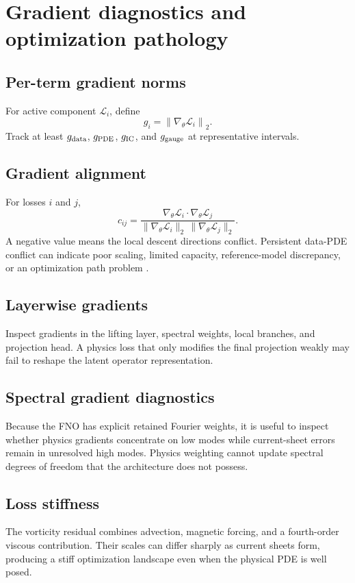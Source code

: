 \documentclass[11pt]{article}
\begin{document}
\section{Gradient diagnostics and optimization pathology}
\label{sec:gradients}

\subsection{Per-term gradient norms}
For active component $\mathcal{L}_i$, define
\begin{equation}
g_i=\left\|\nabla_\theta\mathcal{L}_i\right\|_2.
\end{equation}
Track at least $g_{\rm data}$, $g_{\rm PDE}$, $g_{\rm IC}$, and $g_{\rm gauge}$ at representative intervals.

\subsection{Gradient alignment}
For losses $i$ and $j$,
\begin{equation}
c_{ij}=
\frac{\nabla_\theta\mathcal{L}_i\cdot\nabla_\theta\mathcal{L}_j}
{\|\nabla_\theta\mathcal{L}_i\|_2\,\|\nabla_\theta\mathcal{L}_j\|_2}.
\end{equation}
A negative value means the local descent directions conflict. Persistent data-PDE conflict can indicate poor scaling, limited capacity, reference-model discrepancy, or an optimization path problem \cite{Wang2021Gradients}.

\subsection{Layerwise gradients}
Inspect gradients in the lifting layer, spectral weights, local branches, and projection head. A physics loss that only modifies the final projection weakly may fail to reshape the latent operator representation.

\subsection{Spectral gradient diagnostics}
Because the FNO has explicit retained Fourier weights, it is useful to inspect whether physics gradients concentrate on low modes while current-sheet errors remain in unresolved high modes. Physics weighting cannot update spectral degrees of freedom that the architecture does not possess.

\subsection{Loss stiffness}
The vorticity residual combines advection, magnetic forcing, and a fourth-order viscous contribution. Their scales can differ sharply as current sheets form, producing a stiff optimization landscape even when the physical PDE is well posed.
\end{document}
